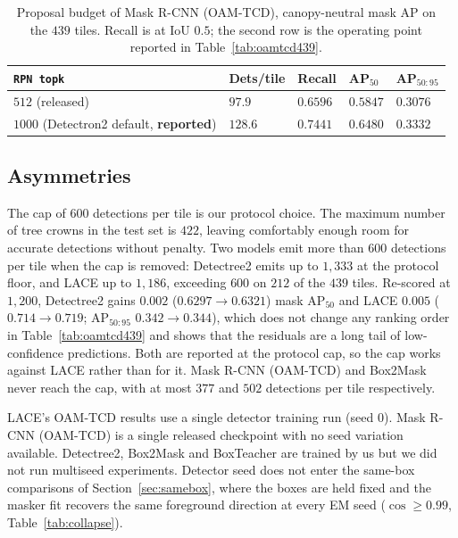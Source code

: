 \documentclass[remotesensing,article,submit,moreauthors]{Definitions/mdpi}
\begin{document}
\begin{table}[H]
\caption{Proposal budget of Mask R-CNN (OAM-TCD), canopy-neutral mask AP on the $439$ tiles. Recall is at IoU $0.5$; the second row is the operating point reported in Table~\ref{tab:oamtcd439}.\label{tab:rpn}}
\begin{tabularx}{\textwidth}{lCCCC}
\toprule
\textbf{\texttt{RPN topk}} & \textbf{Dets/tile} & \textbf{Recall} & \textbf{AP\boldmath$_{50}$} & \textbf{AP\boldmath$_{50:95}$} \\
\midrule
$512$ (released) & $97.9$ & $0.6596$ & $0.5847$ & $0.3076$ \\
$1000$ (Detectron2 default, \textbf{reported}) & $128.6$ & $0.7441$ & $\mathbf{0.6480}$ & $\mathbf{0.3332}$ \\
\bottomrule
\end{tabularx}
\end{table}

\subsection{Asymmetries}

The cap of $600$ detections per tile is our protocol choice. The maximum number of tree crowns in the test set is $422$, leaving comfortably enough room for accurate detections without penalty. Two models emit more than $600$ detections per tile when the cap is removed: Detectree2 emits up to $1{,}333$ at the protocol floor, and LACE up to $1{,}186$, exceeding $600$ on $212$ of the $439$ tiles. Re-scored at $1{,}200$, Detectree2 gains $0.002$ ($0.6297 \rightarrow 0.6321$) mask AP$_{50}$ and LACE $0.005$ ($0.714 \rightarrow 0.719$; AP$_{50:95}$ $0.342 \rightarrow 0.344$), which does not change any ranking order in Table~\ref{tab:oamtcd439} and shows that the residuals are a long tail of low-confidence predictions. Both are reported at the protocol cap, so the cap works against LACE rather than for it. Mask R-CNN (OAM-TCD) and Box2Mask never reach the cap, with at most $377$ and $502$ detections per tile respectively.

LACE's OAM-TCD results use a single detector training run (seed $0$). Mask R-CNN (OAM-TCD) is a single released checkpoint with no seed variation available. Detectree2, Box2Mask and BoxTeacher are trained by us but we did not run multiseed experiments. Detector seed does not enter the same-box comparisons of Section~\ref{sec:samebox}, where the boxes are held fixed and the masker fit recovers the same foreground direction at every EM seed ($\cos \geq 0.99$, Table~\ref{tab:collapse}).
\end{document}
